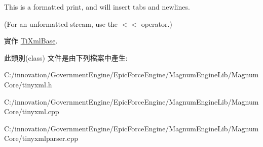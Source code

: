 This is a formatted print, and will insert tabs and newlines.

(For an unformatted stream, use the $<$$<$ operator.) 

實作 \hyperlink{class_ti_xml_base_aaea3e75b489fc3c937f3a7ef096069e7}{Ti\+Xml\+Base}.



此類別(class) 文件是由下列檔案中產生\+:\begin{DoxyCompactItemize}
\item 
C\+:/innovation/\+Government\+Engine/\+Epic\+Force\+Engine/\+Magnum\+Engine\+Lib/\+Magnum\+Core/tinyxml.\+h\item 
C\+:/innovation/\+Government\+Engine/\+Epic\+Force\+Engine/\+Magnum\+Engine\+Lib/\+Magnum\+Core/tinyxml.\+cpp\item 
C\+:/innovation/\+Government\+Engine/\+Epic\+Force\+Engine/\+Magnum\+Engine\+Lib/\+Magnum\+Core/tinyxmlparser.\+cpp\end{DoxyCompactItemize}
